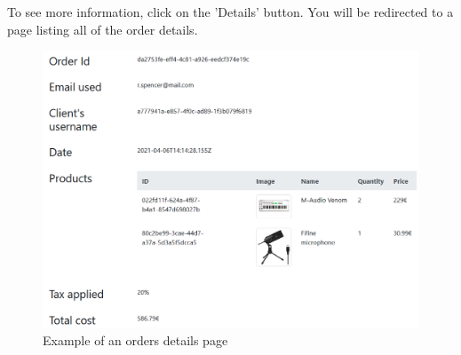 To see more information, click on the 'Details' button. You will be redirected to a page listing all of the order details.

\begin{figure}[H]
\centering
\includegraphics[scale=0.6]{res/Immagini/OrderDetails}
\caption{Example of an orders details page}
\end{figure}

